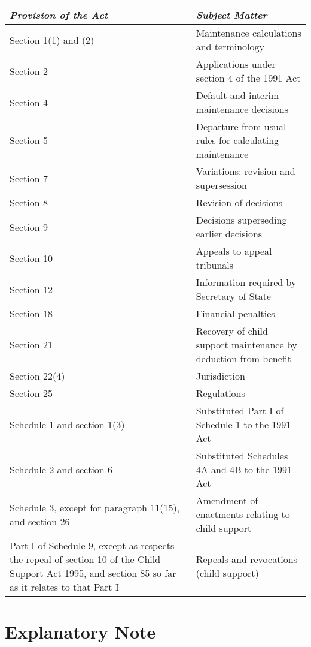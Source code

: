 \documentclass[12pt,a4paper]{article}
\begin{document}
{\footnotesize{}

\begin{longtable}{p{248.50493pt}p{117.48486pt}}
\hline
\itshape Provision of the Act	& \itshape Subject Matter\\
\hline
\endhead
\hline
\endlastfoot
Section 1(1) and (2)	&Maintenance calculations and terminology\\
Section 2	&Applications under section 4 of the 1991 Act\\
Section 4	&Default and interim maintenance decisions\\
Section 5	&Departure from usual rules for calculating maintenance\\
Section 7	&Variations: revision and supersession\\
Section 8&Revision of decisions\\
Section 9	&Decisions superseding earlier decisions\\
Section 10	&Appeals to appeal tribunals\\
Section 12	&Information required by Secretary of State\\
Section 18	&Financial penalties\\
Section 21	&Recovery of child support maintenance by deduction from benefit\\
Section 22(4)	&Jurisdiction\\
Section 25	&Regulations\\
Schedule 1 and section 1(3)	&Substituted Part I of Schedule 1 to the 1991 Act\\
Schedule 2 and section 6	&Substituted Schedules 4A and 4B to the 1991 Act\\
Schedule 3, except for paragraph 11(15), and section 26	&Amendment of enactments relating to child support\\
Part I of Schedule 9, except as respects the repeal of section 10 of the Child Support Act 1995, and section 85 so far as it relates to that Part I	&Repeals and revocations (child support)\\
\end{longtable}

}

\part{Explanatory Note}

\renewcommand\parthead{— Explanatory Note}
\end{document}
